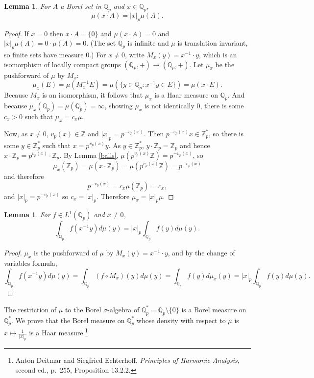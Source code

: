 \documentclass{article}
\newtheorem{lemma}[theorem]{Lemma}
\theoremstyle{definition}
\begin{document}
\begin{lemma}
For $A$ a Borel set in $\mathbb{Q}_p$ and $x \in \mathbb{Q}_p$,
\[
\mu(x\cdot A) = |x|_p \mu(A).
\]
\end{lemma}
\begin{proof}
If $x=0$ then $x\cdot A = \{0\}$ and $\mu(x\cdot A)=0$ and $|x|_p \mu(A) = 0 \cdot \mu(A)=0$.
(The set $\mathbb{Q}_p$ is infinite and $\mu$ is translation invariant,
so finite sets have measure $0$.) 
For $x \neq 0$,
write $M_x(y)=x^{-1}  \cdot y$, which is an isomorphism of locally compact groups $(\mathbb{Q}_p,+)
\to (\mathbb{Q}_p,+)$. Let $\mu_x$ be the pushforward of $\mu$ by $M_x$:
\[
\mu_x(E) = \mu(M_{x}^{-1} E) = \mu(\{y \in \mathbb{Q}_p : x^{-1}y \in E\})
=\mu(x\cdot E).
\]
Because $M_x$ is an isomorphism, it follows that $\mu_x$ is a Haar measure on $\mathbb{Q}_p$. 
And because $\mu_x(\mathbb{Q}_p) = \mu(\mathbb{Q}_p)=\infty$, showing $\mu_x$ is not identically $0$,
there is some
$c_x>0$ such that $\mu_x = c_x \mu$. 

Now, as $x \neq 0$, $v_p(x) \in \mathbb{Z}$ and $|x|_p = p^{-v_p(x)}$. Then
$p^{-v_p(x)} x \in \mathbb{Z}_p^*$, so 
there is some $y \in \mathbb{Z}_p^*$ such that $x = p^{v_p(x)} y$. As $y \in \mathbb{Z}_p^*$, $y \cdot \mathbb{Z}_p
=\mathbb{Z}_p$ and hence $x \cdot \mathbb{Z}_p = p^{v_p(x)} \cdot \mathbb{Z}_p$. 
By Lemma \ref{balls}, $\mu(p^{v_p(x)} \mathbb{Z}) = p^{-v_p(x)}$, so 
\[
\mu_x(\mathbb{Z}_p) = \mu(x \cdot \mathbb{Z}_p) =\mu(p^{v_p(x)} \mathbb{Z}) = p^{-v_p(x)}
\]
and therefore
\[
p^{-v_p(x)} = c_x \mu(\mathbb{Z}_p) = c_x,
\]
and $|x|_p = p^{-v_p(x)}$ so $c_x = |x|_p$. Therefore $\mu_x = |x|_p \mu$.
\end{proof}



\begin{lemma}
For $f \in L^1(\mathbb{Q}_p)$ and $x \neq 0$,
\[
\int_{\mathbb{Q}_p} f(x^{-1} y) d\mu(y) = |x|_p \int_{\mathbb{Q}_p} f(y) d\mu(y).
\]
\label{COV}
\end{lemma}
\begin{proof}
$\mu_x$ is the pushforward of $\mu$ by $M_x(y) = x^{-1} \cdot y$, and by the change of variables formula,
\[
\int_{\mathbb{Q}_p} f(x^{-1} y) d\mu(y) 
=\int_{\mathbb{Q}_p} (f \circ M_x)(y) d\mu(y)
=\int_{\mathbb{Q}_p} f(y) d\mu_x(y)
=|x|_p \int_{\mathbb{Q}_p} f(y) d\mu(y).
\]
\end{proof}



The restriction of $\mu$ to the Borel $\sigma$-algebra of $\mathbb{Q}_p^* = \mathbb{Q}_p \setminus \{0\}$ is
a Borel measure on $\mathbb{Q}_p^*$. We prove that
the Borel measure on $\mathbb{Q}_p^*$ whose density with respect to
$\mu$ is $x \mapsto \frac{1}{|x|_p}$ is a Haar measure.\footnote{Anton Deitmar and Siegfried Echterhoff,
{\em Principles of Harmonic Analysis}, second ed., p.~255, Proposition 13.2.2.}
\end{document}
